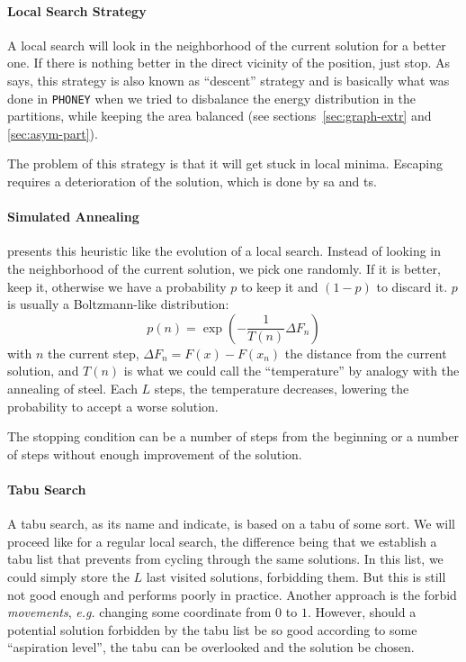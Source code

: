 \documentclass[11pt,a4paper]{report} %
\theoremstyle{customdef}
\begin{document}
\paragraph{Local Search Strategy}
A local search will look in the neighborhood of the current solution for a better one.
If there is nothing better in the direct vicinity of the position, just stop.
As \citet{Pirlot1996} says, this strategy is also known as “descent” strategy and is basically what was done in \texttt{PHONEY} when we tried to disbalance the energy distribution in the partitions, while keeping the area balanced (see sections~\ref{sec:graph-extr} and \ref{sec:asym-part}).

The problem of this strategy is that it will get stuck in local minima.
Escaping requires a deterioration of the solution, which is done by \gls{sa} and \gls{ts}.

\paragraph{Simulated Annealing}
\citet{Pirlot1996} presents this heuristic like the evolution of a local search.
Instead of looking in the neighborhood of the current solution, we pick one randomly.
If it is better, keep it, otherwise we have a probability $p$ to keep it and $(1-p)$ to discard it.
$p$ is usually a Boltzmann-like distribution:
\[p(n) = \exp{\left(-\frac{1}{T(n)} \Delta F_n\right)}\]
with $n$ the current step, $\Delta F_n = F(x) - F(x_n)$ the distance from the current solution, and $T(n)$ is what we could call the “temperature” by analogy with the annealing of steel.
Each $L$ steps, the temperature decreases, lowering the probability to accept a worse solution.

The stopping condition can be a number of steps from the beginning or a number of steps without enough improvement of the solution.

\paragraph{Tabu Search}
A tabu search, as its name and \citet{Pirlot1996} indicate, is based on a tabu of some sort.
We will proceed like for a regular local search, the difference being that we establish a tabu list that prevents from cycling through the same solutions.
In this list, we could simply store the $L$ last visited solutions, forbidding them.
But this is still not good enough and performs poorly in practice.
Another approach is the forbid \textit{movements}, \textit{e.g.} changing some coordinate from $0$ to $1$.
However, should a potential solution forbidden by the tabu list be so good according to some “aspiration level”, the tabu can be overlooked and the solution be chosen.
\end{document}
